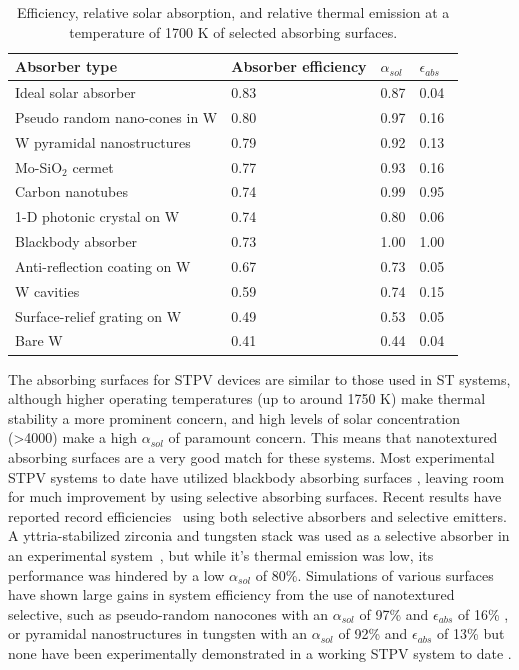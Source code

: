 \documentclass[10pt,letterpaper]{article}
\begin{document}
\begin{table}
	\caption{Efficiency, relative solar absorption, and relative thermal emission at a temperature of 1700 K of selected absorbing surfaces.}
	\label{abs_eff_table}
	\begin{center}
		\begin{tabular}{|llll|}
			\hline
			Absorber type & Absorber efficiency & $\alpha_{sol}$ & $\epsilon_{abs}$\\
			\hline	
			Ideal solar absorber & 0.83 & 0.87 & 0.04\\
			Pseudo random nano-cones in W & 0.80 & 0.97 & 0.16~\cite{me1}\\
			W pyramidal nanostructures & 0.79 & 0.92 & 0.13~\cite{paper1_ref4}\\
			Mo-SiO$_2$ cermet & 0.77 & 0.93 & 0.16~\cite{cermet6}\\
			Carbon nanotubes & 0.74 & 0.99 & 0.95~\cite{MIT_paper}\\
			1-D photonic crystal on W & 0.74 & 0.80 & 0.06~\cite{SKY_JPE_2015}\\
			Blackbody absorber & 0.73 & 1.00 & 1.00\\
			Anti-reflection coating on W & 0.67 & 0.73 & 0.05~\cite{SKY_JPE_2015}\\
			W cavities & 0.59 & 0.74 & 0.15~\cite{exp_russia}\\
			Surface-relief grating on W & 0.49 & 0.53 & 0.05~\cite{paper1_ref6}\\
			Bare W & 0.41 & 0.44 & 0.04~\cite{palik}\\
			\hline
		\end{tabular}
	\end{center}
\end{table}

The absorbing surfaces for STPV devices are similar to those used in ST systems, although higher operating temperatures (up to around 1750 K) 
make thermal stability a more prominent concern, and high levels of solar concentration (\textgreater4000) make a high $\alpha_{sol}$ of 
paramount concern.  This means that nanotextured absorbing surfaces are a very good match for these systems.  Most experimental STPV systems 
to date have utilized blackbody absorbing surfaces \cite{exp_tokyo,exp_madrid,exp_russia,MIT_paper}, leaving room for much improvement by using 
selective absorbing surfaces. Recent results have reported record efficiencies~\cite{g11,SKY_JPE_2015} using both 
selective absorbers and selective emitters. A yttria-stabilized zirconia and tungsten stack was used as a selective absorber in an experimental system~\cite{SKY_JPE_2015}, 
but while it's thermal emission was low, its performance was hindered by a low $\alpha_{sol}$ of 80\%.  Simulations of various surfaces 
have shown large gains in system efficiency from the use of nanotextured selective, such as pseudo-random 
nanocones with an $\alpha_{sol}$ of 97\% and $\epsilon_{abs}$ of 16\% \cite{me1}, or pyramidal nanostructures in tungsten 
with an $\alpha_{sol}$ of 92\% and $\epsilon_{abs}$ of 13\% \cite{paper1_ref4} but none have been experimentally 
demonstrated in a working STPV system to date \cite{paper1_ref5,paper1_ref6}.
\end{document}
